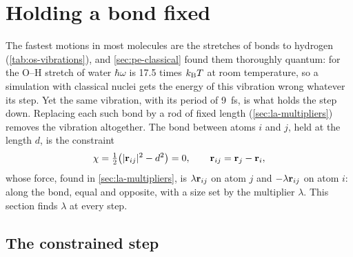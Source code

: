 \section{Holding a bond fixed}
\label{sec:cs-shake}

The fastest motions in most molecules are the stretches of bonds to
hydrogen (\cref{tab:os-vibrations}), and \cref{sec:pe-classical} found
them thoroughly quantum: for the O--H stretch of water $\hbar\omega$ is
17.5 times $k_{\mathrm{B}} T$ at room temperature, so a simulation with classical
nuclei gets the energy of this vibration wrong whatever its step. Yet the
same vibration, with its period of \SI{9}{\femto\second}, is what holds
the step down. Replacing each such bond by a rod of fixed length
(\cref{sec:la-multipliers}) removes the vibration altogether. The bond
between atoms $i$ and $j$, held at the length $d$, is the constraint
\begin{equation*}
   \chi = \tfrac12\bigl(\lvert\bm{\mathrm{r}}_{ij}\rvert^2 - d^2\bigr) = 0 ,
   \qquad \bm{\mathrm{r}}_{ij} = \bm{\mathrm{r}}_j - \bm{\mathrm{r}}_i ,
\end{equation*}
whose force, found in \cref{sec:la-multipliers}, is $\lambda\bm{\mathrm{r}}_{ij}$
on atom $j$ and $-\lambda\bm{\mathrm{r}}_{ij}$ on atom $i$: along the bond, equal
and opposite, with a size set by the multiplier $\lambda$. This section
finds $\lambda$ at every step.

\subsection*{The constrained step}

